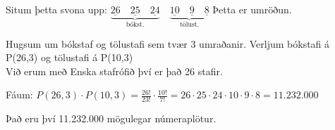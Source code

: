 Situm þetta svona upp: $\underbrace{\underline{26}\quad \underline{25}\quad \underline{24}}_{\text{bókst.}}\quad \underbrace{\underline{10}\quad \underline{9} \quad \underline{8}}_{\text{tölust.}}$ Þetta er umröðun.\vspace*{0.5em}

Hugsum um bókstaf og tölustafi sem tvær 3 umraðanir. Verljum bókstafi á \hspace*{1.3em}P(26,3) og tölustafi á P(10,3)\\
\hspace*{1.3em}Við erum með Enska stafrófið því er það 26 stafir.\vspace*{0.5em}

Fáum: $P(26, 3) \cdot P(10,3) = \frac{26!}{23!} \cdot \frac{10!}{7!} = 26 \cdot 25 \cdot 24 \cdot 10 \cdot 9 \cdot 8 = 11.232.000$\vspace*{0.5em}

Það eru því 11.232.000 mögulegar númeraplötur.
\newpage